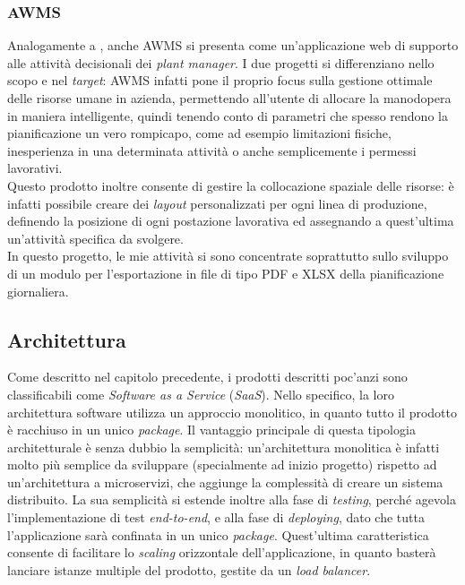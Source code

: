 \subsubsection*{AWMS}
Analogamente a \DS{}, anche AWMS si presenta come un'applicazione web di supporto alle attività decisionali dei \textit{plant manager}. I due progetti si differenziano nello scopo e nel \textit{target}: AWMS infatti pone il proprio focus sulla gestione ottimale delle risorse umane in azienda, permettendo all'utente di allocare la manodopera in maniera intelligente, quindi tenendo conto di parametri che spesso rendono la pianificazione un vero rompicapo, come ad esempio limitazioni fisiche, inesperienza in una determinata attività o anche semplicemente i permessi lavorativi.\\
Questo prodotto inoltre consente di gestire la collocazione spaziale delle risorse: è infatti possibile creare dei \textit{layout} personalizzati per ogni linea di produzione, definendo la posizione di ogni postazione lavorativa ed assegnando a quest'ultima un'attività specifica da svolgere.\\
In questo progetto, le mie attività si sono concentrate soprattutto sullo sviluppo di un modulo per l'esportazione in file di tipo PDF e XLSX della pianificazione giornaliera.
\subsection{Architettura}
\label{subsec:architettura-monolitica}
Come descritto nel capitolo precedente, i prodotti descritti poc'anzi sono classificabili come \textit{Software as a Service} (\textit{SaaS}). Nello specifico, la loro architettura software utilizza un approccio monolitico, in quanto tutto il prodotto è racchiuso in un unico \textit{package}. Il vantaggio principale di questa tipologia architetturale è senza dubbio la semplicità: un'architettura monolitica è infatti molto più semplice da sviluppare (specialmente ad inizio progetto) rispetto ad un'architettura a microservizi, che aggiunge la complessità di creare un sistema distribuito. La sua semplicità si estende inoltre alla fase di \textit{testing}, perché agevola l'implementazione di test \textit{end-to-end}, e alla fase di \textit{deploying}, dato che tutta l'applicazione sarà confinata in un unico \textit{package}. Quest'ultima caratteristica consente di facilitare lo \textit{scaling} orizzontale dell'applicazione, in quanto basterà lanciare istanze multiple del prodotto, gestite da un \textit{load balancer}.\\

